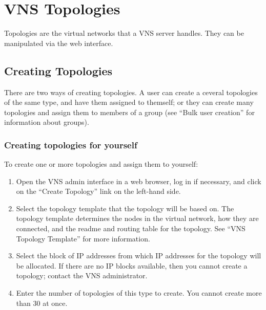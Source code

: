 \documentclass[a4paper,12pt]{report}
\begin{document}
\chapter{VNS Topologies}
Topologies are the virtual networks that a VNS server handles.  They can be manipulated via the web interface.

\section{Creating Topologies}
There are two ways of creating topologies.  A user can create a ceveral topologies of the same type, and have them assigned to themself; or they can create many topologies and assign them to members of a group (see ``Bulk user creation'' for information about groups).

\subsection{Creating topologies for yourself}
To create one or more topologies and assign them to yourself:
\begin{enumerate}
\item Open the VNS admin interface in a web browser, log in if necessary, and click on the ``Create Topology'' link on the left-hand side.
\item Select the topology template that the topology will be based on.  The topology template determines the nodes in the virtual network, how they are connected, and the readme and routing table for the topology.  See ``VNS Topology Template'' for more information.
\item Select the block of IP addresses from which IP addresses for the topology will be allocated.  If there are no IP blocks available, then you cannot create a topology; contact the VNS administrator.
\item Enter the number of topologies of this type to create.  You cannot create more than 30 at once.
\end{enumerate}
\end{document}
